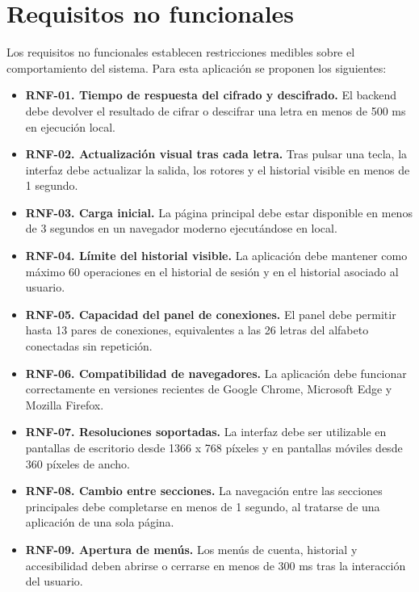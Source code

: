 \section{Requisitos no funcionales}

Los requisitos no funcionales establecen restricciones medibles sobre el comportamiento del sistema. Para esta aplicación se proponen los siguientes:

\begin{itemize}
    \item \textbf{RNF-01. Tiempo de respuesta del cifrado y descifrado.} El backend debe devolver el resultado de cifrar o descifrar una letra en menos de 500 ms en ejecución local.

    \item \textbf{RNF-02. Actualización visual tras cada letra.} Tras pulsar una tecla, la interfaz debe actualizar la salida, los rotores y el historial visible en menos de 1 segundo.

    \item \textbf{RNF-03. Carga inicial.} La página principal debe estar disponible en menos de 3 segundos en un navegador moderno ejecutándose en local.

    \item \textbf{RNF-04. Límite del historial visible.} La aplicación debe mantener como máximo 60 operaciones en el historial de sesión y en el historial asociado al usuario.

    \item \textbf{RNF-05. Capacidad del panel de conexiones.} El panel debe permitir hasta 13 pares de conexiones, equivalentes a las 26 letras del alfabeto conectadas sin repetición.

    \item \textbf{RNF-06. Compatibilidad de navegadores.} La aplicación debe funcionar correctamente en versiones recientes de Google Chrome, Microsoft Edge y Mozilla Firefox.

    \item \textbf{RNF-07. Resoluciones soportadas.} La interfaz debe ser utilizable en pantallas de escritorio desde 1366 x 768 píxeles y en pantallas móviles desde 360 píxeles de ancho.

    \item \textbf{RNF-08. Cambio entre secciones.} La navegación entre las secciones principales debe completarse en menos de 1 segundo, al tratarse de una aplicación de una sola página.

    \item \textbf{RNF-09. Apertura de menús.} Los menús de cuenta, historial y accesibilidad deben abrirse o cerrarse en menos de 300 ms tras la interacción del usuario.


\end{itemize}
